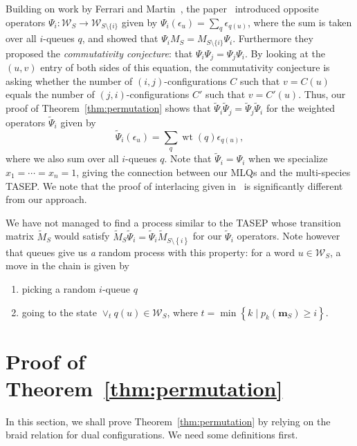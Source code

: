 \documentclass[reqno]{amsart}
\newcommand{\0}{\phantom{c}}
\newcommand{\merge}[1]{\vee_{#1}} %
\DeclareMathOperator{\wt}{wt} %
\newcommand{\mm}{\mathbf{m}}
\newcommand{\mcW}{\mathcal{W}}
\let\sumnonlimits\sum
\renewcommand{\sum}{\sumnonlimits\limits}
\newcommand{\set}[1]{\left\{ #1 \right\}}
\newcommand{\defn}[1]{{\color{darkred}\emph{#1}}} %
\theoremstyle{plain}
\theoremstyle{definition}
\numberwithin{equation}{section}
\begin{document}
Building on work by Ferrari and Martin~\cite{FM06,FM07}, the paper~\cite{AAMP} introduced opposite operators $\Psi_i \colon \mcW_S \to \mcW_{S \setminus \{i\}}$ given by $\Psi_i(\epsilon_u) = \sum_{q} \epsilon_{q(u)}$, where the sum is taken over all $i$-queues $q$, and showed that $\Psi_i M_S = M_{S \setminus \{i\}} \Psi_i$.
Furthermore they proposed the \defn{commutativity conjecture}: that $\Psi_i \Psi_j = \Psi_j \Psi_i$.
By looking at the $(u,v)$ entry of both sides of this equation, the commutativity conjecture is asking whether the number of $(i,j)$-configurations $C$ such that $v = C(u)$ equals the number of $(j,i)$-configurations $C'$ such that $v = C'(u)$. 
Thus, our proof of Theorem~\ref{thm:permutation} shows that $\widetilde{\Psi}_i \widetilde{\Psi}_j = \widetilde{\Psi}_j \widetilde{\Psi}_i$ for the weighted operators $\widetilde{\Psi}_i$ given by
\[
\widetilde{\Psi}_i(\epsilon_u) = \sum_q \wt(q) \epsilon_{q(u)},
\]
where we also sum over all $i$-queues $q$.
Note that $\widetilde{\Psi}_i = \Psi_i$ when we specialize $x_1 = \cdots = x_n = 1$, giving the connection between our MLQs and the multi-species TASEP.
We note that the proof of interlacing given in~\cite{AAMP} is significantly different from our approach.

We have not managed to find a process similar to the TASEP whose transition matrix $\widetilde{M}_S$ would satisfy $\widetilde{M}_S \widetilde{\Psi}_i = \widetilde{\Psi}_i \widetilde{M}_{S \setminus \set{i}}$ for our $\widetilde{\Psi}_i$ operators.
Note however that queues give us \emph{a} random process with this property: for a word $u \in \mcW_S$, a move in the chain is given by
\begin{enumerate}
\item picking a random $i$-queue $q$
\item going to the state $\merge{t} q(u) \in \mcW_S$, where $t = \min\set{k \mid p_k(\mm_S) \geq i}$.
\end{enumerate}









\section{Proof of Theorem~\ref{thm:permutation}}
\label{sec:thm_proof}

In this section, we shall prove Theorem~\ref{thm:permutation} by relying on the
braid relation for dual configurations. We need some definitions first.
\end{document}
